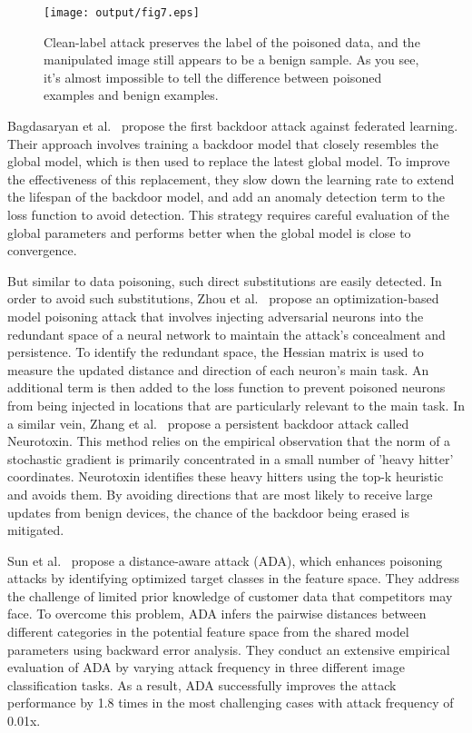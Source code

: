 \begin{figure}[h]
    \centering
    \texttt{[image: output/fig7.eps]}
     \caption{Clean-label attack preserves the label of the poisoned data,
     and the manipulated image still appears to be a benign sample. As
     you see, it’s almost impossible to tell the difference between poisoned
     examples and benign examples.}
     \label{fig7}
\end{figure}

Bagdasaryan et al.~\cite{bagdasaryan2020backdoor} propose the first backdoor
attack against federated learning. Their approach involves
training a backdoor model that closely resembles the
global model, which is then used to replace the latest
global model. To improve the effectiveness of this
replacement, they slow down the learning rate to extend
the lifespan of the backdoor model, and add an anomaly
detection term to the loss function to avoid detection.
This strategy requires careful evaluation of the global
parameters and performs better when the global model
is close to convergence.  

But similar to data poisoning, such direct substitutions
are easily detected. In order to avoid such substitutions,
Zhou et al.~\cite{zhang2022neurotoxin} propose an optimization-based model
poisoning attack that involves injecting adversarial
neurons into the redundant space of a neural network to
maintain the attack's concealment and persistence. To
identify the redundant space, the Hessian matrix is used
to measure the updated distance and direction of each
neuron's main task. An additional term is then added
to the loss function to prevent poisoned neurons from
being injected in locations that are particularly relevant
to the main task. In a similar vein, Zhang et al.~\cite{zhou2021deep} 
propose a persistent backdoor attack called Neurotoxin.
This method relies on the empirical observation that the
norm of a stochastic gradient is primarily concentrated in
a small number of 'heavy hitter' coordinates. Neurotoxin
identifies these heavy hitters using the top-k heuristic and
avoids them. By avoiding directions that are most likely
to receive large updates from benign devices, the chance
of the backdoor being erased is mitigated. 

Sun et al.~\cite{sun2022semi} propose a distance-aware attack (ADA),
which enhances poisoning attacks by identifying optimized
target classes in the feature space. They address the
challenge of limited prior knowledge of customer data that
competitors may face. To overcome this problem, ADA
infers the pairwise distances between different categories
in the potential feature space from the shared model
parameters using backward error analysis. They conduct
an extensive empirical evaluation of ADA by varying
attack frequency in three different image classification
tasks. As a result, ADA successfully improves the attack
performance by 1.8 times in the most challenging cases
with attack frequency of 0.01x.  


